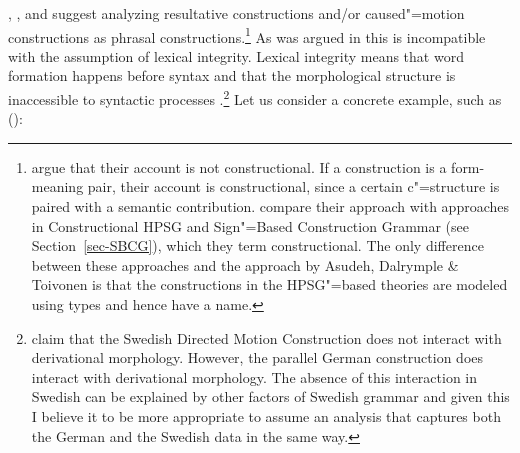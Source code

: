 \largerpage
\citet{GJ2004a}, \citet{Alsina96a}, and \citet*{ADT2008a,ADT2013a} suggest analyzing resultative
constructions and/or caused"=motion constructions as phrasal constructions.\footnote{%
\citet[Section~2.3]{AT2014a} argue that their account is not constructional. If a construction is a
form-meaning pair, their account is constructional, since a certain c"=structure is paired with a
semantic contribution. \citet[Section~2.2]{AT2014a} compare their approach with approaches in Constructional
HPSG \citep{Sag97a} and Sign"=Based Construction Grammar (see Section~\ref{sec-SBCG}), which they term constructional. The only difference
between these approaches and the approach by Asudeh, Dalrymple \& Toivonen is that the constructions in the HPSG"=based theories are modeled using types and
hence have a name.%
} As was argued in
 this is incompatible with the assumption of lexical integrity. Lexical
integrity means that word formation happens before syntax and that the morphological structure is inaccessible to
syntactic processes \citep{BM95a}.\footnote{%
  \citet[]{ADT2013a} claim that the Swedish Directed Motion Construction does not interact
  with derivational morphology. However, the parallel German construction does interact with
  derivational morphology. The absence of this interaction in Swedish can be explained by other
  factors of Swedish grammar and given this I believe it to be more appropriate to assume an
  analysis that captures both the German and the Swedish data in the same way.%
}
Let us consider a concrete example, such as ():
\eal
\label{ex-tanzt-schuhe-blutig}
